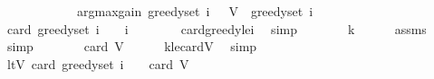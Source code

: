\begin{isabellebody}
\ \ \ \ \ \ \ \ \ \ \ {\isasymunion}\ {\isacharbraceleft}{\kern0pt}argmax{\isacharunderscore}{\kern0pt}gain\ {\isacharparenleft}{\kern0pt}greedy{\isacharunderscore}{\kern0pt}set\ {\isacharparenleft}{\kern0pt}i\ {\isacharminus}{\kern0pt}\ {}{\isacharparenright}{\kern0pt}{\isacharparenright}{\kern0pt}\ {\isacharparenleft}{\kern0pt}V\ {\isacharminus}{\kern0pt}\ greedy{\isacharunderscore}{\kern0pt}set\ {\isacharparenleft}{\kern0pt}i\ {\isacharminus}{\kern0pt}\ {}{\isacharparenright}{\kern0pt}{\isacharparenright}{\kern0pt}{\isacharbraceright}{\kern0pt}{\isachardoublequoteclose}\isanewline
%
\isadelimproof
%
\endisadelimproof
%
\isatagproof
{}\isamarkupfalse%
\ {\isacharminus}{\kern0pt}\isanewline
\ \ \isamarkupfalse%
\ {\isachardoublequoteopen}card\ {\isacharparenleft}{\kern0pt}greedy{\isacharunderscore}{\kern0pt}set\ {\isacharparenleft}{\kern0pt}i\ {\isacharminus}{\kern0pt}\ {}{\isacharparenright}{\kern0pt}{\isacharparenright}{\kern0pt}\ {\isasymle}\ i\ {\isacharminus}{\kern0pt}\ {}{\isachardoublequoteclose}\isanewline
\ \ \ \ \isamarkupfalse%
\ card{\isacharunderscore}{\kern0pt}greedy{\isacharunderscore}{\kern0pt}le{\isacharunderscore}{\kern0pt}i\ \isamarkupfalse%
\ simp\isanewline
\ \ \isamarkupfalse%
\ \isamarkupfalse%
\ {\isachardoublequoteopen}{\isachardot}{\kern0pt}{\isachardot}{\kern0pt}{\isachardot}{\kern0pt}\ {\isacharless}{\kern0pt}\ k{\isachardoublequoteclose}\isanewline
\ \ \ \ \isamarkupfalse%
\ assms{\isacharparenleft}{\kern0pt}{}{\isacharcomma}{\kern0pt}{}{\isacharparenright}{\kern0pt}\ \isamarkupfalse%
\ simp\isanewline
\ \ \isamarkupfalse%
\ \isamarkupfalse%
\ {\isachardoublequoteopen}{\isachardot}{\kern0pt}{\isachardot}{\kern0pt}{\isachardot}{\kern0pt}\ {\isasymle}\ card\ V{\isachardoublequoteclose}\isanewline
\ \ \ \ \isamarkupfalse%
\ k{\isacharunderscore}{\kern0pt}le{\isacharunderscore}{\kern0pt}cardV\ \isamarkupfalse%
\ simp\isanewline
\ \ \isamarkupfalse%
\ \isamarkupfalse%
\ ltV{\isacharcolon}{\kern0pt}\ {\isachardoublequoteopen}card\ {\isacharparenleft}{\kern0pt}greedy{\isacharunderscore}{\kern0pt}set\ {\isacharparenleft}{\kern0pt}i\ {\isacharminus}{\kern0pt}\ {}{\isacharparenright}{\kern0pt}{\isacharparenright}{\kern0pt}\ {\isacharless}{\kern0pt}\ card\ V{\isachardoublequoteclose}\ \isakeywordONE{{\isachardot}{\kern0pt}}\isamarkupfalse%

\end{isabellebody}
